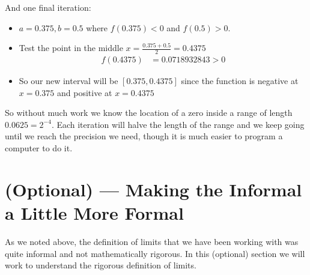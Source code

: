 \begin{eg}
And one final iteration:
\begin{itemize}
 \item $a=0.375, b=0.5$ where $f(0.375)<0$ and $f(0.5)>0$.
 \item Test the point in the middle $x = \frac{0.375+0.5}{2} = 0.4375$
\begin{align*}
  f(0.4375) &= 0.0718932843>0
\end{align*}
\item So our new interval will be $[0.375,0.4375]$ since the function is
negative at $x=0.375$ and positive at $x=0.4375$
\end{itemize}
So without much work we know the location of a zero inside a range of length
$0.0625 = 2^{-4}$. Each iteration will halve the length of the range and we
keep going until we reach the precision we need, though it is much easier to
program a computer to do it.
\end{eg}

\section{(Optional) --- Making the Informal a Little More Formal}
\label{sec opt formal limit}
As we noted above, the definition of limits that we have been working with was
quite informal and not mathematically rigorous. In this (optional) section we
will work to understand the rigorous definition of limits.

